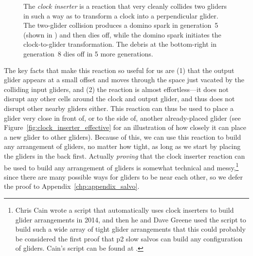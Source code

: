 \begin{figure}[!htb]
	\centering
	\caption{The \emph{clock inserter} is a reaction that very cleanly collides two gliders in such a way as to transform a clock into a perpendicular glider. The two-glider collision produces a domino spark in generation~5 (shown in ) and then dies off, while the domino spark initiates the clock-to-glider transformation. The debris at the bottom-right in generation~8 dies off in 5 more generations.}\label{fig:clock_inserter}
\end{figure}

The key facts that make this reaction so useful for us are (1) that the output glider appears at a small offset and moves through the space just vacated by the colliding input gliders, and (2) the reaction is almost effortless---it does not disrupt any other cells around the clock and output glider, and thus does not disrupt other nearby gliders either. This reaction can thus be used to place a glider very close in front of, or to the side of, another already-placed glider (see Figure~\ref{fig:clock_inserter_effective} for an illustration of how closely it can place a new glider to other gliders). Because of this, we can use this reaction to build any arrangement of gliders, no matter how tight, as long as we start by placing the gliders in the back first. Actually \emph{proving} that the clock inserter reaction can be used to build any arrangement of gliders is somewhat technical and messy,\footnote{Chris Cain wrote a script that automatically uses clock inserters to build glider arrangements in 2014, and then he and Dave Greene used the script to build such a wide array of tight glider arrangements that this could probably be considered the first proof that p2 slow salvos can build any configuration of gliders. Cain's script can be found at .} since there are many possible ways for gliders to be near each other, so we defer the proof to Appendix~\ref{chp:appendix_salvo}.


